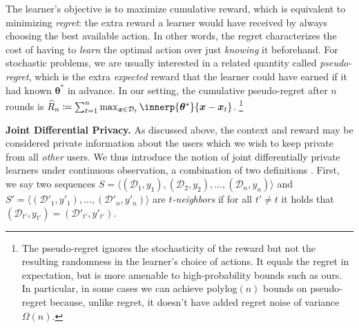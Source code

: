 \documentclass{article}
\newcommand{\os}[1]{\textcolor{red}{Or's comment:~\textbf{#1}}}
\renewcommand{\vec}[1]{\bm{#1}}
\newcommand{\defeq}{\coloneq}
\newcommand{\D}{\mathcal{D}}
\renewcommand{\paragraph}[1]{\vspace{2pt}\noindent\textbf{#1}}
\begin{document}
The learner's objective is to maximize cumulative reward, which is
equivalent to minimizing \emph{regret}: the extra reward a learner
would have received by always choosing the best available action.
In other words, the regret characterizes the cost of having to
\emph{learn} the optimal action over just \emph{knowing} it
beforehand.  For stochastic problems, we are usually interested in a
related quantity called \emph{pseudo-regret}, which is the extra
\emph{expected} reward that the learner could have earned if it had
known $\vec\theta^*$ in advance.  In our setting, the cumulative
pseudo-regret after $n$ rounds is
$\widehat{R}_n \defeq \sum_{t=1}^n\max_{\vec
  x\in\D_t}\innerp{\vec\theta^*}{\vec x - \vec x_t}$.%
\footnote{The pseudo-regret ignores the stochasticity of the reward
  but not the resulting randomness in the learner's choice of actions.
  It equals the regret in expectation, but is more amenable to
  high-probability bounds such as ours.  In particular, in some cases
  we can achieve polylog$(n)$ bounds on pseudo-regret because, unlike
  regret, it doesn't have added regret noise of variance $\Omega(n)$.}


\paragraph{Joint Differential Privacy.} %
As discussed above, the context and reward may be considered private
information about the users which we wish to keep private from all
\emph{other} users. We thus introduce the notion of joint
differentially private learners under continuous observation, a
combination of two definitions \citep[given
in][]{KearnsMechanismDesign2014,DworkContinualObservation2010}. First,
we say two sequences
$S = \langle (\mathcal{D}_1, y_1), (\mathcal{D}_2, y_2), ...,
(\mathcal{D}_n, y_n) \rangle$ and
$S' = \langle (\mathcal{D}'_1, y'_1), ..., (\mathcal{D}'_n, y'_n)
\rangle$ are \emph{$t$-neighbors} if for all $t'\neq t$ it holds that
$(\mathcal{D}_{t'},y_{t'}) = (\mathcal{D}'_{t'}, y'_{t'})$.
\end{document}

